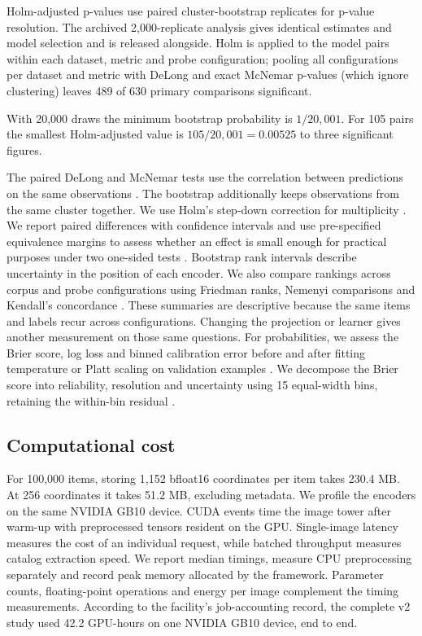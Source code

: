 \documentclass[preprint,12pt]{elsarticle}
\begin{document}
Holm-adjusted p-values use \resHolmReplicates{} paired cluster-bootstrap replicates for p-value resolution.
The archived 2,000-replicate analysis gives identical estimates and model selection and is released alongside.
Holm is applied to the \resHolmComparisonsPrimaryPolyvoreVTwoCleanCpAuc{} model pairs within each dataset, metric and probe configuration; pooling all configurations per dataset and metric with DeLong and exact McNemar p-values (which ignore clustering) leaves 489 of 630 primary comparisons significant.

With 20,000 draws the minimum bootstrap probability is $1/20{,}001$. For 105 pairs the smallest Holm-adjusted value is $105/20{,}001=0.00525$ to three significant figures.

The paired DeLong and McNemar tests use the correlation between predictions on the same observations \cite{delong1988,mcnemar1947}. The bootstrap additionally keeps observations from the same cluster together. We use Holm's step-down correction for multiplicity \cite{holm1979}.
We report paired differences with confidence intervals and use pre-specified
equivalence margins to assess whether an effect is small enough for practical
purposes under two one-sided tests \cite{schuirmann1987}. Bootstrap rank intervals describe uncertainty in the position of each
encoder. We also compare rankings across corpus and probe configurations using Friedman ranks, Nemenyi comparisons and Kendall's concordance \cite{demsar2006statistical,kendall}. These summaries are descriptive because the same items and labels recur across configurations. Changing the projection or learner gives another measurement on those same questions. For probabilities, we assess the Brier score, log loss and binned
calibration error before and after fitting temperature or Platt scaling on
validation examples \cite{platt,ece}. We decompose the Brier score into reliability, resolution and uncertainty using 15 equal-width bins, retaining the within-bin residual \cite{murphy}.

\subsection{Computational cost}
For 100,000 items, storing 1,152 bfloat16 coordinates per item takes 230.4 MB. At 256 coordinates it takes 51.2 MB, excluding metadata. We profile the encoders on the same NVIDIA GB10 device. CUDA events time the
image tower after warm-up with preprocessed tensors resident on the GPU.
Single-image latency measures the cost of an individual request, while batched
throughput measures catalog extraction speed. We report median timings, measure CPU preprocessing separately and record peak
memory allocated by the framework. Parameter counts, floating-point operations
and energy per image complement the timing measurements. According to the facility's job-accounting record, the complete v2 study used 42.2 GPU-hours on one NVIDIA GB10 device, end to end.





\end{document}
